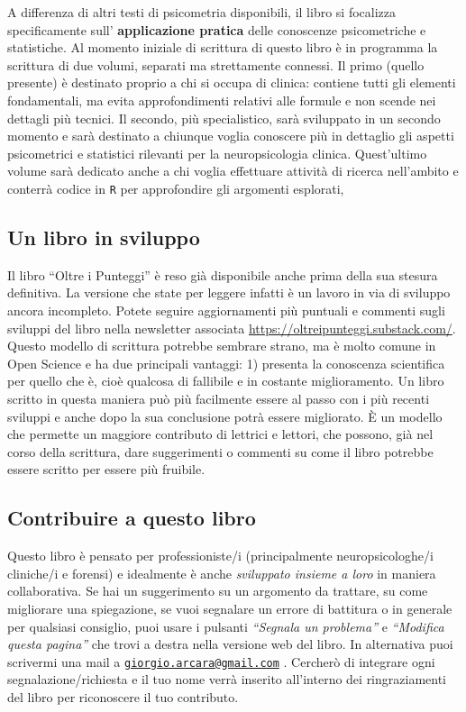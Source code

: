 \documentclass[
  italian,
  letterpaper,
  paper=A4,
  headinclude=on,
  footinclude=on,
  12pt]{scrbook}
\begin{document}
A differenza di altri testi di psicometria disponibili, il libro si
focalizza specificamente sull' \textbf{applicazione pratica} delle
conoscenze psicometriche e statistiche. Al momento iniziale di scrittura
di questo libro è in programma la scrittura di due volumi, separati ma
strettamente connessi. Il primo (quello presente) è destinato proprio a
chi si occupa di clinica: contiene tutti gli elementi fondamentali, ma
evita approfondimenti relativi alle formule e non scende nei dettagli
più tecnici. Il secondo, più specialistico, sarà sviluppato in un
secondo momento e sarà destinato a chiunque voglia conoscere più in
dettaglio gli aspetti psicometrici e statistici rilevanti per la
neuropsicologia clinica. Quest'ultimo volume sarà dedicato anche a chi
voglia effettuare attività di ricerca nell'ambito e conterrà codice in
\texttt{R} per approfondire gli argomenti esplorati,

\subsection*{Un libro in sviluppo}\label{un-libro-in-sviluppo}

Il libro ``Oltre i Punteggi'' è reso già disponibile anche prima della
sua stesura definitiva. La versione che state per leggere infatti è un
lavoro in via di sviluppo ancora incompleto. Potete seguire
aggiornamenti più puntuali e commenti sugli sviluppi del libro nella
newsletter associata \url{https://oltreipunteggi.substack.com/}. Questo
modello di scrittura potrebbe sembrare strano, ma è molto comune in Open
Science e ha due principali vantaggi: 1) presenta la conoscenza
scientifica per quello che è, cioè qualcosa di fallibile e in costante
miglioramento. Un libro scritto in questa maniera può più facilmente
essere al passo con i più recenti sviluppi e anche dopo la sua
conclusione potrà essere migliorato. È un modello che permette un
maggiore contributo di lettrici e lettori, che possono, già nel corso
della scrittura, dare suggerimenti o commenti su come il libro potrebbe
essere scritto per essere più fruibile.

\subsection*{Contribuire a questo
libro}\label{contribuire-a-questo-libro}

Questo libro è pensato per professioniste/i (principalmente
neuropsicologhe/i cliniche/i e forensi) e idealmente è anche
\emph{sviluppato insieme a loro} in maniera collaborativa. Se hai un
suggerimento su un argomento da trattare, su come migliorare una
spiegazione, se vuoi segnalare un errore di battitura o in generale per
qualsiasi consiglio, puoi usare i pulsanti \emph{``Segnala un
problema''} e \emph{``Modifica questa pagina''} che trovi a destra nella
versione web del libro. In alternativa puoi scrivermi una mail a
\href{mailto:giorgio.arcara@gmail.com}{\nolinkurl{giorgio.arcara@gmail.com}}
. Cercherò di integrare ogni segnalazione/richiesta e il tuo nome verrà
inserito all'interno dei ringraziamenti del libro per riconoscere il tuo
contributo.
\end{document}
